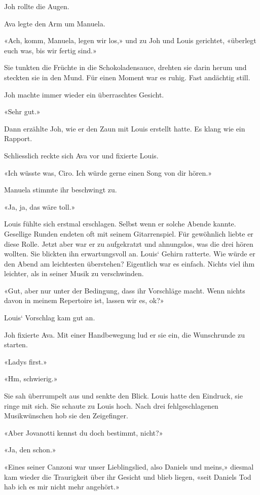 Joh rollte die Augen.

Ava legte den Arm um Manuela.

«Ach, komm, Manuela, legen wir los,» und zu Joh und Louis gerichtet,
«überlegt euch was, bis wir fertig sind.»

Sie tunkten die Früchte in die Schokoladensauce, drehten sie darin herum
und steckten sie in den Mund. Für einen Moment war es ruhig. Fast
andächtig still.

Joh machte immer wieder ein überraschtes Gesicht.

«Sehr gut.»

Dann erzählte Joh, wie er den Zaun mit Louis erstellt hatte. Es klang
wie ein Rapport.

Schliesslich reckte sich Ava vor und fixierte Louis.

«Ich wüsste was, Ciro. Ich würde gerne einen Song von dir hören.»

Manuela stimmte ihr beschwingt zu.

«Ja, ja, das wäre toll.»

Louis fühlte sich erstmal erschlagen. Selbst wenn er solche Abende
kannte. Gesellige Runden endeten oft mit seinem Gitarrenspiel. Für
gewöhnlich liebte er diese Rolle. Jetzt aber war er zu aufgekratzt und
ahnungslos, was die drei hören wollten. Sie blickten ihn erwartungsvoll
an. Louis` Gehirn ratterte. Wie würde er den Abend am leichtesten
überstehen? Eigentlich war es einfach. Nichts viel ihm leichter, als in
seiner Musik zu verschwinden.

«Gut, aber nur unter der Bedingung, dass ihr Vorschläge macht. Wenn
nichts davon in meinem Repertoire ist, lassen wir es, ok?»

Louis` Vorschlag kam gut an.

Joh fixierte Ava. Mit einer Handbewegung lud er sie ein, die Wunschrunde
zu starten.

«Ladys first.»

«Hm, schwierig.»

Sie sah überrumpelt aus und senkte den Blick. Louis hatte den Eindruck,
sie ringe mit sich. Sie schaute zu Louis hoch. Nach drei
fehlgeschlagenen Musikwünschen hob sie den Zeigefinger.

«Aber Jovanotti kennst du doch bestimmt, nicht?»

«Ja, den schon.»

«Eines seiner Canzoni war unser Lieblingslied, also Daniels und meins,»
diesmal kam wieder die Traurigkeit über ihr Gesicht und blieb liegen,
«seit Daniels Tod hab ich es mir nicht mehr angehört.»

